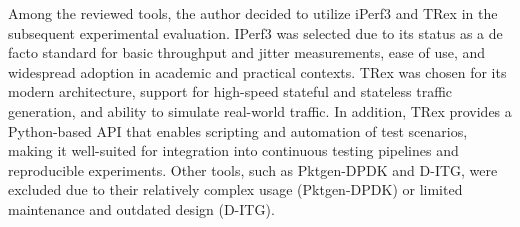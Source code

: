 Among the reviewed tools, the author decided to utilize iPerf3 and TRex in the subsequent experimental evaluation. 
IPerf3 was selected due to its status as a de facto standard for basic throughput and jitter measurements, ease of use, and widespread adoption in academic and practical contexts. 
TRex was chosen for its modern architecture, support for high-speed stateful and stateless traffic generation, and ability to simulate real-world traffic. 
In addition, TRex provides a Python-based API that enables scripting and automation of test scenarios, making it well-suited for integration into continuous testing pipelines and reproducible experiments. 
Other tools, such as Pktgen-DPDK and D-ITG, were excluded due to their relatively complex usage (Pktgen-DPDK) or limited maintenance and outdated design (D-ITG).

